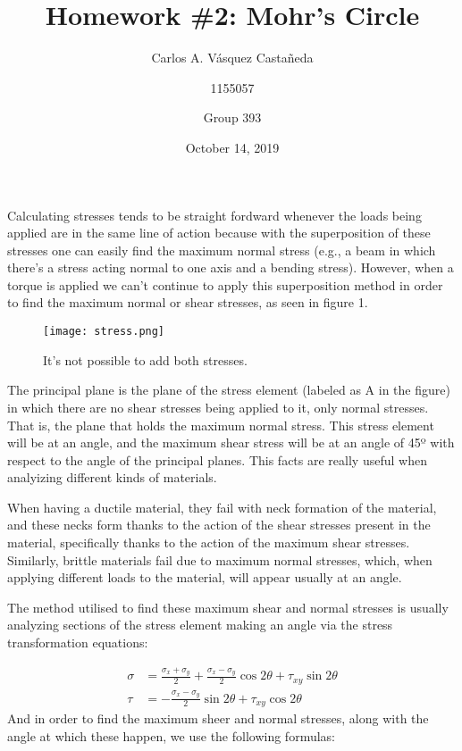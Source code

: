 \documentclass[12pt, letterpaper]{article}
\title{Homework \#2: Mohr's Circle}
\author{Carlos A. Vásquez Castañeda \and 1155057 \and Group 393}
\date{October 14, 2019}
\begin{document}
\maketitle
Calculating stresses tends to be straight fordward whenever the loads being applied are in the same line of action because with the superposition of these stresses one can easily find the maximum normal stress (e.g., a beam in which there's a stress acting normal to one axis and a bending stress). However, when a torque is applied we can't continue to apply this superposition method in order to find the maximum normal or shear stresses, as seen in figure 1.

\begin{figure}[H]
	\centering
	\texttt{[image: stress.png]}
	\caption{It's not possible to add both stresses.}
\end{figure}

The principal plane is the plane of the stress element (labeled as A in the figure) in which there are no shear stresses being applied to it, only normal stresses. That is, the plane that holds the maximum normal stress. This stress element will be at an angle, and the maximum shear stress will be at an angle of 45º with respect to the angle of the principal planes. This facts are really useful when analyizing different kinds of materials. 

When having a ductile material, they fail with neck formation of the material, and these necks form thanks to the action of the shear stresses present in the material, specifically thanks to the action of the maximum shear stresses. Similarly, brittle materials fail due to maximum normal stresses, which, when applying different loads to the material, will appear usually at an angle.

The method utilised to find these maximum shear and normal stresses is usually analyzing sections of the stress element making an angle via the stress transformation equations:

\begin{equation}
	\begin{split}
		\sigma &= \frac{\sigma_x + \sigma_y}{2} + \frac{\sigma_x - \sigma_y}{2}\cos 2\theta + \tau_{xy}\sin 2\theta\\
		\tau &= -\frac{\sigma_x - \sigma_y}{2}\sin 2\theta + \tau_{xy}\cos 2\theta
	\end{split}
\end{equation}
And in order to find the maximum sheer and normal stresses, along with the angle at which these happen, we use the following formulas:
\end{document}
